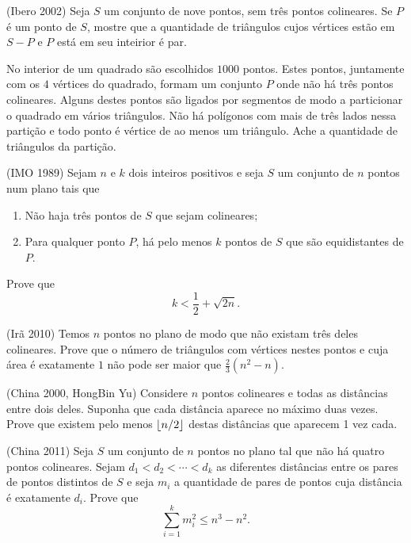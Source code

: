 \documentclass[10pt,a4paper]{article}
\begin{document}
	\begin{prob}(Ibero 2002)
		Seja $S$ um conjunto de nove pontos, sem três pontos colineares. Se $P$ é um ponto de $S$, mostre que a quantidade de triângulos cujos vértices estão em $S - {P}$ e $P$ está em seu inteirior é par.
	\end{prob}
	\begin{prob}
		No interior de um quadrado são escolhidos $1000$ pontos. Estes pontos, juntamente com os $4$ vértices do quadrado, formam um conjunto $P$ onde não há três pontos colineares. Alguns destes pontos são ligados por segmentos de modo a particionar o quadrado em vários triângulos. Não há polígonos com mais de três lados nessa partição e todo ponto é vértice de ao menos um triângulo. Ache a quantidade de triângulos da partição.
	\end{prob}
	\begin{prob}(IMO 1989)
		Sejam $n$ e $k$ dois inteiros positivos e seja $S$ um conjunto de $n$ pontos num plano tais que
		\begin{enumerate}[label = (\roman*)]
			\item Não haja três pontos de $S$ que sejam colineares;
			\item Para qualquer ponto $P$, há pelo menos $k$ pontos de $S$ que são equidistantes de $P$.
		\end{enumerate}

		Prove que $$k < \frac{1}{2} + \sqrt{2n}.$$
	\end{prob}
	\begin{prob}(Irã 2010)
		Temos $n$ pontos no plano de modo que não existam três deles colineares. Prove que o número de triângulos com vértices nestes pontos e cuja área é exatamente $1$ não pode ser maior que $\frac{2}{3}(n^2 - n)$.
	\end{prob}
	\begin{prob}(China 2000, HongBin Yu)
		Considere $n$ pontos colineares e todas as distâncias entre dois deles. Suponha que cada distância aparece no máximo duas vezes. Prove que existem pelo menos $\left \lfloor{n/2}\right \rfloor$ destas distâncias que aparecem 1 vez cada.
	\end{prob}
	\begin{prob}(China 2011)
		Seja $S$ um conjunto de $n$ pontos no plano tal que não há quatro pontos colineares. Sejam $d_1 < d_2 < \cdots < d_k$ as diferentes distâncias entre os pares de pontos distintos de $S$ e seja $m_i$ a quantidade de pares de pontos cuja distância é exatamente $d_i$. Prove que $$\sum_{i = 1}^{k} m_i^2 \le n^3 - n^2.$$
	\end{prob}
\end{document}
